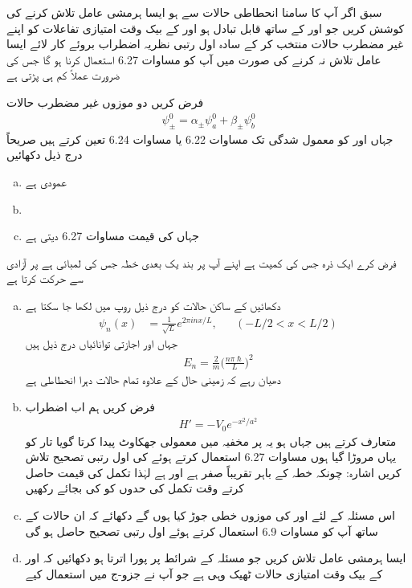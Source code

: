 سبق  اگر آپ کا سامنا انحطاطی حالات سے ہو ایسا ہرمشی عامل  تلاش کرنے کی کوشش کریں جو  اور  کے ساتھ قابل تبادل ہو  اور  کے بیک وقت امتیازی تفاعلات کو اپنے غیر مضطرب حالات منتخب کر کے سادہ اول رتبی نظریہ اضطراب بروئے کار لائے ایسا عامل تلاش نہ کرنے کی صورت میں آپ کو مساوات 6.27 استعمال کرنا ہو گا جس کی ضرورت عملاً  کم ہی پڑتی ہے 


فرض کریں  دو موزوں غیر مضطرب حالات
\begin{align*}
\psi_\pm^0 = \alpha_\pm \psi_a^0 + \beta_\pm \psi_b^0
\end{align*}
جہاں  اور  کو معمول شدگی تک مساوات 6.22 یا مساوات 6.24 تعین کرتے ہیں  صریحاً  درج ذیل دکھائیں 
\begin{enumerate}[a.]
\item
{} عمودی ہے   
\item
{} 
\item
{} جہاں  کی قیمت مساوات 6.27 دیتی ہے 
\end{enumerate}
فرض کرے ایک ذرہ جس کی کمیت  ہے اپنے آپ پر بند یک بعدی خطہ جس کی لمبائی  ہے پر آزادی سے حرکت کرتا ہے 
\begin{enumerate}[a.]
\item
دکھائیں کے ساکن حالات کو درج ذیل روپ میں لکھا جا سکتا ہے 
 \begin{align*}
\psi_n (x) &= \frac{1}{\sqrt{L}} e^{2 \pi i n x/ L}, &&(-L/2 < x < L/2)
\end{align*}
جہاں  اور اجازتی توانائیاں درج ذیل ہیں 
\begin{align*}
E_n = \frac{2}{m} \big ( \frac{n \pi \hslash}{L} \big )^2
\end{align*}
دھیان رہے کہ زمینی حال  کے علاوہ تمام حالات دہرا انحطاطی ہے 
\item
فرض کریں ہم اب اضطراب 
\begin{align*}
H' = -V_0 e^{-x^2 / a^2}
\end{align*}
متعارف کرتے ہیں جہاں  ہو یہ  پر مخفیہ میں معمولی جھکاوٹ پیدا کرتا گویا تار کو یہاں مروڑا گیا ہوں مساوات 6.27 استعمال کرتے ہوئے  کی اول رتبی  تصحیح  تلاش کریں اشارہ: چونکہ  خطہ  کے باہر تقریباً  صفر ہے اور  ہے لہٰذا تکمل کی قیمت حاصل کرتے وقت تکمل کی حدوں کو  کی بجائے   رکھیں 
\item
اس مسئلہ کے لئے  اور  کی موزوں خطی جوڑ کیا ہوں گے دکھائے کہ ان حالات کے ساتھ آپ کو مساوات 6.9 استعمال کرتے ہوئے اول رتبی  تصحیح  حاصل ہو گی 
\item
ایسا ہرمشی عامل  تلاش کریں جو مسئلہ کے شرائط پر پورا اترتا ہو دکھائیں کہ  اور  کے بیک وقت امتیازی حالات ٹھیک وہی ہے  جو آپ نے جزو-ج میں استعمال کیے 
\end{enumerate}

